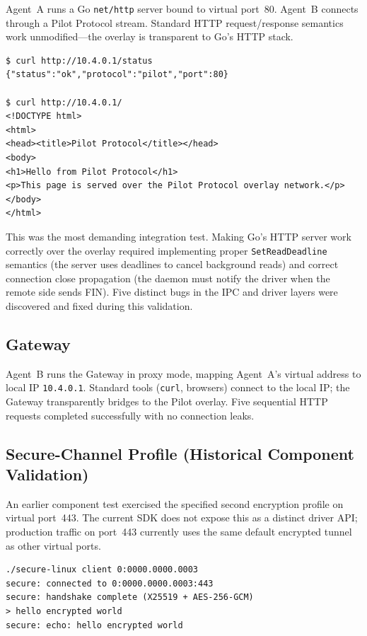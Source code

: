 \documentclass[11pt,a4paper]{article}
\begin{document}
Agent~A runs a Go \texttt{net/http} server bound to virtual port~80. Agent~B connects through a Pilot Protocol stream. Standard HTTP request/response semantics work unmodified---the overlay is transparent to Go's HTTP stack.

\begin{lstlisting}[basicstyle=\ttfamily\small]
$ curl http://10.4.0.1/status
{"status":"ok","protocol":"pilot","port":80}

$ curl http://10.4.0.1/
<!DOCTYPE html>
<html>
<head><title>Pilot Protocol</title></head>
<body>
<h1>Hello from Pilot Protocol</h1>
<p>This page is served over the Pilot Protocol overlay network.</p>
</body>
</html>
\end{lstlisting}

This was the most demanding integration test. Making Go's HTTP server work correctly over the overlay required implementing proper \texttt{SetReadDeadline} semantics (the server uses deadlines to cancel background reads) and correct connection close propagation (the daemon must notify the driver when the remote side sends FIN). Five distinct bugs in the IPC and driver layers were discovered and fixed during this validation.

\subsection{Gateway}

Agent~B runs the Gateway in proxy mode, mapping Agent~A's virtual address to local IP \texttt{10.4.0.1}. Standard tools (\texttt{curl}, browsers) connect to the local IP; the Gateway transparently bridges to the Pilot overlay. Five sequential HTTP requests completed successfully with no connection leaks.

\subsection{Secure-Channel Profile (Historical Component Validation)}

An earlier component test exercised the specified second encryption profile on virtual port~443. The current SDK does not expose this as a distinct driver API; production traffic on port~443 currently uses the same default encrypted tunnel as other virtual ports.

\begin{lstlisting}[basicstyle=\ttfamily\small]
./secure-linux client 0:0000.0000.0003
secure: connected to 0:0000.0000.0003:443
secure: handshake complete (X25519 + AES-256-GCM)
> hello encrypted world
secure: echo: hello encrypted world
\end{lstlisting}
\end{document}
